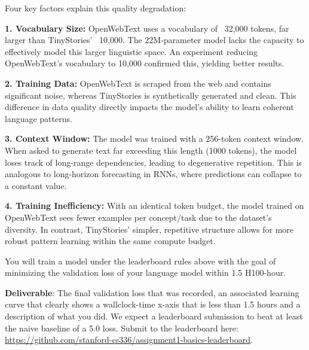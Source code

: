 \begin{answer}
Four key factors explain this quality degradation:

\textbf{1. Vocabulary Size:} OpenWebText uses a vocabulary of ~32,000 tokens, far larger than TinyStories' ~10,000. The 22M-parameter model lacks the capacity to effectively model this larger linguistic space. An experiment reducing OpenWebText's vocabulary to 10,000 confirmed this, yielding better results.

\textbf{2. Training Data:} OpenWebText is scraped from the web and contains significant noise, whereas TinyStories is synthetically generated and clean. This difference in data quality directly impacts the model's ability to learn coherent language patterns.

\textbf{3. Context Window:} The model was trained with a 256-token context window. When asked to generate text far exceeding this length (1000 tokens), the model loses track of long-range dependencies, leading to degenerative repetition. This is analogous to long-horizon forecasting in RNNs, where predictions can collapse to a constant value.

\textbf{4. Training Inefficiency:} With an identical token budget, the model trained on OpenWebText sees fewer examples per concept/task due to the dataset's diversity. In contrast, TinyStories' simpler, repetitive structure allows for more robust pattern learning within the same compute budget.

\end{answer}


You will train a model under the leaderboard rules above with the goal of minimizing the validation loss of your language model within 1.5 H100-hour.

\textbf{Deliverable}: The final validation loss that was recorded, an associated learning curve that clearly shows a wallclock-time x-axis that is less than 1.5 hours and a description of what you did. We expect a leaderboard submission to beat at least the naive baseline of a 5.0 loss. Submit to the leaderboard here: \url{https://github.com/stanford-cs336/assignment1-basics-leaderboard}.

